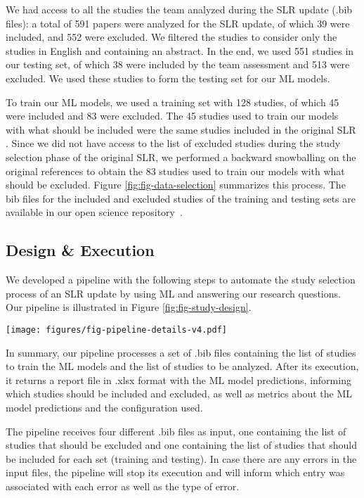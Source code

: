We had access to all the studies the team analyzed during the SLR update (.bib files): a total of 591 papers were analyzed for the SLR update, of which 39 were included, and 552 were excluded. We filtered the studies to consider only the studies in English and containing an abstract. In the end, we used 551 studies in our testing set, of which 38 were included by the team assessment and 513 were excluded. We used these studies to form the testing set for our ML models. 

To train our ML models, we used a training set with 128 studies, of which 45 were included and 83 were excluded. The 45 studies used to train our models with what should be included were the same studies included in the original SLR \cite{Wohlin2022}. Since we did not have access to the list of excluded studies during the study selection phase of the original SLR, we performed a backward snowballing \cite{Wohlin14} on the original references to obtain the 83 studies used to train our models with what should be excluded. Figure \ref{fig:fig-data-selection} summarizes this process. The bib files for the included and excluded studies of the training and testing sets are available in our open science repository~\cite{zenodoOpenScience}.

\subsection{Design \& Execution}
\label{subsec:studydesing}

We developed a pipeline with the following steps to automate the study selection process of an SLR update by using ML and answering our research questions. Our pipeline is illustrated in Figure \ref{fig:fig-study-design}. 

\begin{figure*} [ht]
    \centering
    \texttt{[image: figures/fig-pipeline-details-v4.pdf]}
    \caption{Study design pipeline}
    \label{fig:fig-study-design}
\end{figure*}

In summary, our pipeline processes a set of .bib files containing the list of studies to train the ML models and the list of studies to be analyzed. After its execution, it returns a report file in .xlsx format with the ML model predictions, informing which studies should be included and excluded, as well as metrics about the ML model predictions and the configuration used.

The pipeline receives four different .bib files as input, one containing the list of studies that should be excluded and one containing the list of studies that should be included for each set (training and testing). In case there are any errors in the input files, the pipeline will stop its execution and will inform which entry was associated with each error as well as the type of error. 

